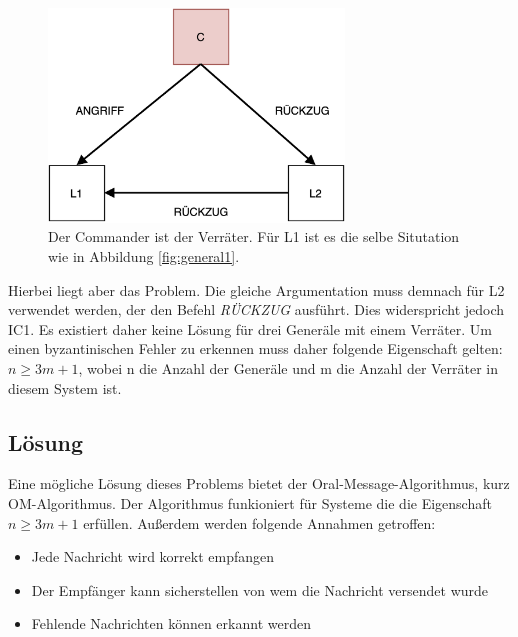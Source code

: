 \documentclass{article}
\begin{document}
\begin{figure}[H]
    \centering
    \includegraphics[width=0.7\textwidth]{general2.png}
    \caption{Der Commander ist der Verräter. Für L1 ist es die selbe Situtation wie in Abbildung \ref{fig:general1}.}
    \label{fig:general2}
\end{figure}

Hierbei liegt aber das Problem. Die gleiche Argumentation muss demnach für L2
verwendet werden, der den Befehl \textit{RÜCKZUG} ausführt. Dies widerspricht jedoch 
IC1. Es existiert daher keine Lösung für drei Generäle mit einem Verräter. 
Um einen byzantinischen Fehler zu erkennen muss daher folgende Eigenschaft gelten: $n \geq 3m + 1$, 
wobei n die Anzahl der Generäle und m die Anzahl der Verräter in diesem System ist.

\subsection{Lösung}

Eine mögliche Lösung dieses Problems bietet der Oral-Message-Algorithmus, kurz OM-Algorithmus. Der
Algorithmus funkioniert für Systeme die die Eigenschaft $n \geq 3m + 1$ erfüllen. Außerdem werden 
folgende Annahmen getroffen: \\

\begin{itemize}
    \item Jede Nachricht wird korrekt empfangen 
    \item Der Empfänger kann sicherstellen von wem die Nachricht versendet wurde 
    \item Fehlende Nachrichten können erkannt werden
\end{itemize}

\end{document}
